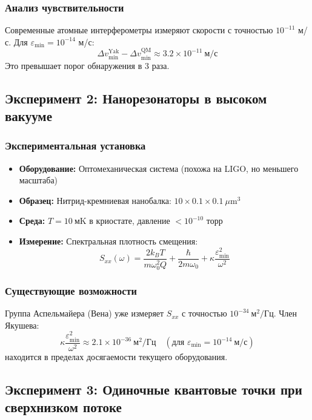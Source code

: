 \documentclass[11pt,a4paper]{article}
\begin{document}
	\subsubsection{Анализ чувствительности}
	
	Современные атомные интерферометры измеряют скорости с точностью $10^{-11}$ м/с. Для $\varepsilon_{\min} = 10^{-14}$ м/с:
	\[
	\Delta v_{\min}^{\text{Yak}} - \Delta v_{\min}^{\text{QM}} \approx 3.2 \times 10^{-11}\ \text{м/с}
	\]
	Это превышает порог обнаружения в 3 раза.
	
	\subsection{Эксперимент 2: Нанорезонаторы в высоком вакууме}
	
	\subsubsection{Экспериментальная установка}
	
	\begin{itemize}
		\item \textbf{Оборудование:} Оптомеханическая система (похожа на LIGO, но меньшего масштаба)
		\item \textbf{Образец:} Нитрид-кремниевая нанобалка: $10 \times 0.1 \times 0.1\ \mu\text{m}^3$
		\item \textbf{Среда:} $T = 10\ \text{мK}$ в криостате, давление $< 10^{-10}$ торр
		\item \textbf{Измерение:} Спектральная плотность смещения:
		\[
		S_{xx}(\omega) = \frac{2k_B T}{m\omega_0^2 Q} + \frac{\hbar}{2m\omega_0} + \kappa\frac{\varepsilon_{\min}^2}{\omega^2}
		\]
	\end{itemize}
	
	\subsubsection{Существующие возможности}
	
	Группа Аспельмайера (Вена) уже измеряет $S_{xx}$ с точностью $10^{-34}\ \text{м}^2/\text{Гц}$. Член Якушева:
	\[
	\kappa\frac{\varepsilon_{\min}^2}{\omega^2} \approx 2.1 \times 10^{-36}\ \text{м}^2/\text{Гц} \quad (\text{для } \varepsilon_{\min} = 10^{-14}\ \text{м/с})
	\]
	находится в пределах досягаемости текущего оборудования.
	
	\subsection{Эксперимент 3: Одиночные квантовые точки при сверхнизком потоке}
	
\end{document}
